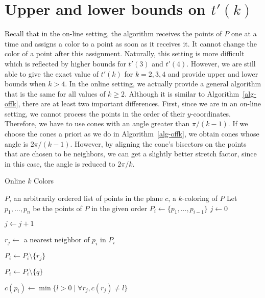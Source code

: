 \documentclass[pdftex,leqno,fleqn,12pts]{llncs}
\begin{document}
\section{Upper and lower bounds on $t'(k)$}
\label{section-online}
 
Recall that in the on-line setting, the algorithm 
receives the points of $P$ one at a time and assigns a color to a point as soon as it receives it.
It cannot change the color of a point after this assignment. Naturally, this setting is more difficult which is
reflected by higher bounds for $t'(3)$ and $t'(4)$. However, we are still able to give the exact value of $t'(k)$ 
for $k=2,3,4$ and provide upper and lower bounds when $k>4$.
In the online setting, we actually provide a general algorithm that is the same 
for all values of $k\geq 2$. Although it is similar to 
Algorithm~\ref{alg-offk}, there are at least two important differences. 
First, since we are in an on-line setting, we cannot process the points 
in the order of their $y$-coordinates. Therefore, we have to use cones 
with an angle greater than $\pi/(k-1)$. If we choose the cones a priori as we do in 
Algorithm~\ref{alg-offk}, we obtain cones whose angle is $2\pi/(k-1)$. 
However, by aligning the cone's bisectors on the points that are chosen 
to be neighbors, we can get a slightly better stretch factor, since in this case, the angle
is reduced to $2\pi/k$. 

\begin{algorithm}
\caption{Online $k$ Colors}\label{alg-onk}
\begin{algorithmic}[1]
\REQUIRE $P$, an arbitrarily ordered list of points in the plane
\ENSURE $c$, a $k$-coloring of $P$
\STATE Let $p_1,\ldots,p_n$ be the points of $P$ in the given order
\STATE $P_i\leftarrow \{p_1,\ldots,p_{i-1}\}$
\STATE $j\leftarrow 0$

\STATE $j\leftarrow j+1$

\STATE $r_j\leftarrow$ a nearest neighbor of $p_i$ in $P_i$

\STATE $P_i\leftarrow P_i\setminus \{r_j\}$



\STATE $P_i\leftarrow P_i\setminus \{q\}$

\ENDIF

\ENDFOR

\ENDWHILE

\STATE $c(p_i)\leftarrow \min\{l>0 \mid \forall r_j,c(r_j)\neq l\}$

\ENDFOR
\end{algorithmic}
\end{algorithm}
\end{document}
